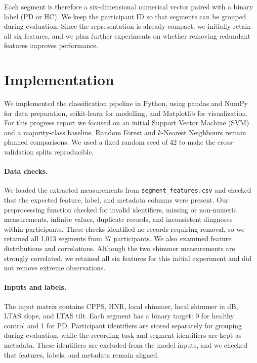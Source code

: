 \documentclass[11pt]{article}
\begin{document}
Each segment is therefore a six-dimensional numerical vector paired with a binary label
(PD or HC). We keep the participant ID so that segments can be grouped during evaluation.
Since the representation is already compact, we initially retain all six features, and we
plan further experiments on whether removing redundant features improves performance.

\section{Implementation}

We implemented the classification pipeline in Python, using pandas and NumPy for data
preparation, scikit-learn for modelling, and Matplotlib for visualization. For this
progress report we focused on an initial Support Vector Machine (SVM) and a majority-class
baseline. Random Forest and $k$-Nearest Neighbours remain planned comparisons. We used a
fixed random seed of 42 to make the cross-validation splits reproducible.

\paragraph{Data checks.}
We loaded the extracted measurements from \texttt{segment\_features.csv} and checked that
the expected feature, label, and metadata columns were present. Our preprocessing function
checked for invalid identifiers, missing or non-numeric measurements, infinite values,
duplicate records, and inconsistent diagnoses within participants. These checks identified
no records requiring removal, so we retained all 1,013 segments from 37 participants. We
also examined feature distributions and correlations. Although the two shimmer
measurements are strongly correlated, we retained all six features for this initial
experiment and did not remove extreme observations.

\paragraph{Inputs and labels.}
The input matrix contains CPPS, HNR, local shimmer, local shimmer in dB, LTAS slope, and
LTAS tilt. Each segment has a binary target: 0 for healthy control and 1 for PD.
Participant identifiers are stored separately for grouping during evaluation, while the
recording task and segment identifiers are kept as metadata. These identifiers are
excluded from the model inputs, and we checked that features, labels, and metadata remain
aligned.
\end{document}
